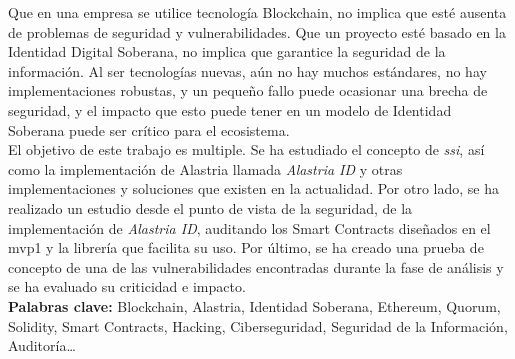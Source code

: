         Que en una empresa se utilice tecnología Blockchain, no implica que esté ausenta de problemas de seguridad y vulnerabilidades. Que un proyecto esté basado en la Identidad Digital Soberana, no implica que garantice la seguridad de la información. Al ser tecnologías nuevas, aún no hay muchos estándares, no hay implementaciones robustas, y un pequeño fallo puede ocasionar una brecha de seguridad, y el impacto que esto puede tener en un modelo de Identidad Soberana puede ser crítico para el ecosistema.\\
        
        El objetivo de este trabajo es multiple. Se ha estudiado el concepto de \textit{\acrfull{ssi}}, así como la implementación de Alastria llamada \textit{Alastria ID} y otras implementaciones y soluciones que existen en la actualidad. Por otro lado, se ha realizado un estudio desde el punto de vista de la seguridad, de la implementación de \textit{Alastria ID}, auditando los Smart Contracts diseñados en el \acrshort{mvp}1 y la librería que facilita su uso. Por último, se ha creado una prueba de concepto de una de las vulnerabilidades encontradas durante la fase de análisis y se ha evaluado su criticidad e impacto.\\
        
        \textbf{Palabras clave:} Blockchain, Alastria, Identidad Soberana, Ethereum, Quorum, Solidity, Smart Contracts, Hacking, Ciberseguridad, Seguridad de la Información, Auditoría\ldots

